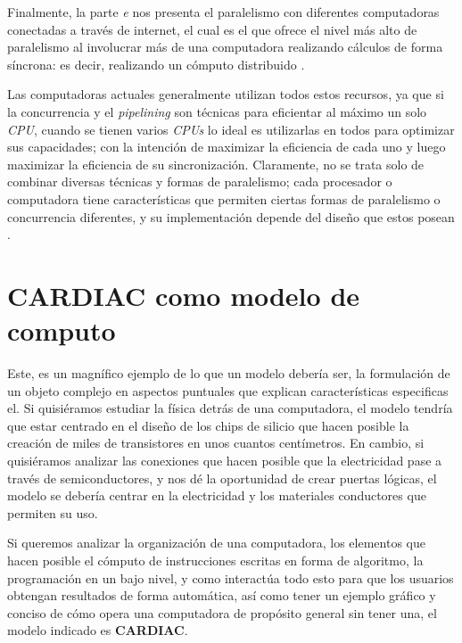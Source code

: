\documentclass[letterpaper,12pt,oneside]{book}
\begin{document}
        Finalmente, la parte \textit{e} nos presenta el paralelismo
		con diferentes computadoras conectadas a través de internet, el cual es el que ofrece el nivel más alto de paralelismo al involucrar
		más de una computadora realizando cálculos de forma síncrona: es decir, realizando un cómputo distribuido \cite{tanenbaum_structured_2013}.

		
		
		Las computadoras actuales generalmente utilizan todos estos recursos, ya que si la concurrencia y el \textit{pipelining} son técnicas
		para eficientar al máximo un solo \textit{CPU}, cuando se tienen varios \textit{CPUs} lo ideal es utilizarlas en todos para optimizar sus capacidades; con la intención de maximizar la eficiencia de cada uno y luego maximizar la eficiencia
		de su sincronización. Claramente, no se trata solo de combinar diversas técnicas y formas de paralelismo; cada procesador o computadora
		tiene características que permiten ciertas formas de paralelismo o concurrencia diferentes, y su implementación depende del diseño que estos posean \cite{tanenbaum_structured_2013}.

	\clearpage			
	
	\section{CARDIAC como modelo de computo}
	
	Este, es un magnífico ejemplo de lo que un modelo debería ser, la formulación de un objeto
	complejo en aspectos puntuales que explican características especificas el.
 Si quisiéramos estudiar la física detrás de una computadora, el modelo tendría que estar centrado
	en el diseño de los chips de silicio que hacen posible la creación de miles de transistores en unos cuantos centímetros. En cambio, si quisiéramos 
	analizar las conexiones que hacen posible que la electricidad pase a través de semiconductores, y nos dé la oportunidad de crear puertas lógicas,
	el modelo se debería centrar en la electricidad y los materiales conductores que permiten su uso.
 
    Si queremos analizar la organización
	de una computadora, los elementos que hacen posible el cómputo de instrucciones escritas en 
	forma de algoritmo, la programación
	en un bajo nivel, y como interactúa todo esto para que los usuarios obtengan resultados 
	de forma automática, así como tener un ejemplo gráfico y 	
	conciso de cómo opera una computadora
	de propósito general sin tener una, el modelo indicado es \textbf{CARDIAC}.
	
\end{document}
